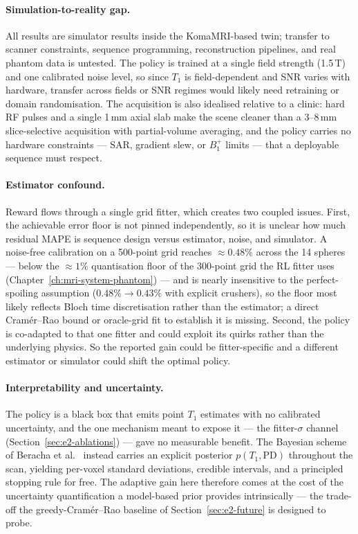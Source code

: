 \paragraph{Simulation-to-reality gap.} All results are simulator results inside
the KomaMRI-based twin; transfer to scanner constraints, sequence programming,
reconstruction pipelines, and real phantom data is untested. The policy is
trained at a single field strength (1.5\,T) and one calibrated noise level, so
since $T_1$ is field-dependent and SNR varies with hardware, transfer across
fields or SNR regimes would likely need retraining or domain randomisation. The
acquisition is also idealised relative to a clinic: hard RF pulses and a single
1\,mm axial slab make the scene cleaner than a 3--8\,mm slice-selective
acquisition with partial-volume averaging, and the policy carries no hardware
constraints --- SAR, gradient slew, or $B_1^+$ limits --- that a deployable
sequence must respect.

\paragraph{Estimator confound.} Reward flows through a single grid fitter, which
creates two coupled issues. First, the achievable error floor is not pinned
independently, so it is unclear how much residual MAPE is sequence design versus
estimator, noise, and simulator. A noise-free calibration on a 500-point grid
reaches ${\approx}0.48\%$ across the 14 spheres --- below the ${\approx}1\%$
quantisation floor of the 300-point grid the RL fitter uses
(Chapter~\ref{ch:mri-system-phantom}) --- and is nearly insensitive to the
perfect-spoiling assumption ($0.48\%\!\to\!0.43\%$ with explicit crushers), so
the floor most likely reflects Bloch time discretisation rather than the
estimator; a direct Cram\'er--Rao bound or oracle-grid fit to establish it is
missing. Second, the policy is co-adapted to that one fitter and could exploit
its quirks rather than the underlying physics. So the reported gain could be fitter-specific and a
different estimator or simulator could shift the optimal policy.

\paragraph{Interpretability and uncertainty.} The policy is a black box that
emits point $T_1$ estimates with no calibrated uncertainty, and the one
mechanism meant to expose it --- the fitter-$\sigma$ channel
(Section~\ref{sec:e2-ablations}) --- gave no measurable benefit. The Bayesian
scheme of Beracha et al.~\cite{adaptive_mri:23} instead carries an explicit
posterior $p(T_1,\mathrm{PD})$ throughout the scan, yielding per-voxel standard
deviations, credible intervals, and a principled stopping rule for free. The
adaptive gain here therefore comes at the cost of the uncertainty
quantification a model-based prior provides intrinsically --- the trade-off the
greedy-Cram\'er--Rao baseline of Section~\ref{sec:e2-future} is designed to
probe.

